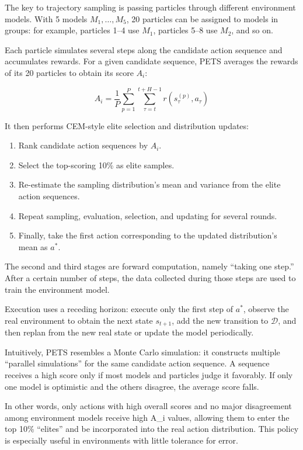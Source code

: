 The key to trajectory sampling is passing particles through different environment models. With 5 models \(M_1,\ldots,M_5\), 20 particles can be assigned to models in groups: for example, particles 1--4 use \(M_1\), particles 5--8 use \(M_2\), and so on.

Each particle simulates several steps along the candidate action sequence and accumulates rewards. For a given candidate sequence, PETS averages the rewards of its 20 particles to obtain its score \(A_i\):

\[
A_i=\frac{1}{P}\sum_{p=1}^{P}\sum_{\tau=t}^{t+H-1}r(s_{\tau}^{(p)},a_{\tau})
\]

It then performs CEM-style elite selection and distribution updates:

\begin{enumerate}
\def\labelenumi{\arabic{enumi}.}
\tightlist
\item
  Rank candidate action sequences by \(A_i\).
\item
  Select the top-scoring 10\% as elite samples.
\item
  Re-estimate the sampling distribution's mean and variance from the elite action sequences.
\item
  Repeat sampling, evaluation, selection, and updating for several rounds.
\item
  Finally, take the first action corresponding to the updated distribution's mean as \(a^*\).
\end{enumerate}

The second and third stages are forward computation, namely ``taking one step.'' After a certain number of steps, the data collected during those steps are used to train the environment model.

Execution uses a receding horizon: execute only the first step of \(a^*\), observe the real environment to obtain the next state \(s_{t+1}\), add the new transition to \(\mathcal D\), and then replan from the new real state or update the model periodically.

Intuitively, PETS resembles a Monte Carlo simulation: it constructs multiple ``parallel simulations'' for the same candidate action sequence. A sequence receives a high score only if most models and particles judge it favorably. If only one model is optimistic and the others disagree, the average score falls.

In other words, only actions with high overall scores and no major disagreement among environment models receive high A\_i values, allowing them to enter the top 10\% ``elites'' and be incorporated into the real action distribution. This policy is especially useful in environments with little tolerance for error.

